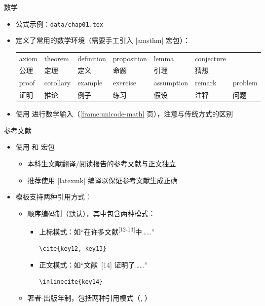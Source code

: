 \begin{frame}[fragile]{数学}
  \begin{itemize}
    \item 公式示例：\nolinkurl{data/chap01.tex}
    \item \ThuThesis{} 定义了常用的数学环境（需要手工引入 |amsthm| 宏包）：
      \begin{table}[h]
        \centering
        \footnotesize
\begin{tabular}{*{7}{l}}\toprule
  axiom & theorem & definition & proposition & lemma & conjecture &\\
  公理 & 定理 & 定义 & 命题 & 引理 & 猜想 &\\\midrule
  proof & corollary & example & exercise & assumption & remark & problem \\
  证明 & 推论 & 例子& 练习 & 假设 & 注释 & 问题\\\bottomrule
\end{tabular}
      \end{table}
      \item \ThuThesis{} 使用  进行数学输入（\ref{frame:unicode-math} 页），注意与传统方式的区别
  \end{itemize}
\end{frame}

\begin{frame}[fragile]{参考文献}
  \begin{itemize}
    \item 使用 \BibTeX 和  宏包
      \begin{itemize}
        \item 本科生文献翻译/阅读报告的参考文献与正文独立
        \item 推荐使用 |latexmk| 编译以保证参考文献生成正确
      \end{itemize}
    \item 模板支持两种引用方式：
      \begin{itemize}
        \item 顺序编码制（默认），其中包含两种模式：
        \begin{itemize}
          \item 上标模式：如“在许多文献\textsuperscript{[12-13]}中……”
          \begin{lstlisting}[basicstyle=\ttfamily]
    \cite{key12, key13}
          \end{lstlisting}
        \item 正文模式：如“文献~[14] 证明了……”
          \begin{lstlisting}[basicstyle=\ttfamily]
    \inlinecite{key14}
          \end{lstlisting}
        \end{itemize}
        \item 著者-出版年制，包括两种引用模式（, ）
      \end{itemize}
    \end{itemize}
\end{frame}

